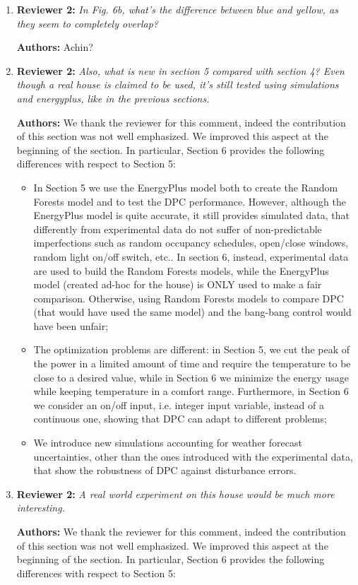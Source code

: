 \documentclass{article}
\begin{document}
\begin{enumerate}
\item \textbf{Reviewer 2:} \textit{In Fig. 6b, what's the difference between blue and yellow, as they seem to completely overlap?}



\textbf{Authors:} Achin?



\item \textbf{Reviewer 2:} \textit{Also, what is new in section 5 compared with section 4? Even though a real house is claimed to be used, it's still tested using simulations and energyplus, like in the previous sections.}


\textbf{Authors:} We thank the reviewer for this comment, indeed the contribution of this section was not well emphasized. We improved this aspect at the beginning of the section. In particular, Section 6 provides the following differences with respect to Section 5:
\begin{itemize}
	\item In Section 5 we use the EnergyPlus model both to create the Random Forests model and to test the DPC performance.
	However, although the EnergyPlus model is quite accurate, it still provides simulated data, that differently from experimental data do not suffer of non-predictable imperfections such as random occupancy schedules, open/close windows, random light on/off switch, etc.. In section 6, instead, experimental data are used to build the Random Forests models, while the EnergyPlus model (created ad-hoc for the house) is ONLY used to make a fair comparison. Otherwise, using Random Forests models to compare DPC (that would have used the same model) and the bang-bang control would have been unfair;
	\item The optimization problems are different: in Section 5, we cut the peak of the power in a limited amount of time and require the temperature to be close to a desired value, while in Section 6 we minimize the energy usage while keeping temperature in a comfort range. Furthermore, in Section 6 we consider an on/off input, i.e. integer input variable, instead of a continuous one, showing that DPC can adapt to different problems;
	\item We introduce new simulations accounting for weather forecast uncertainties, other than the ones introduced with the experimental data, that show the robustness of DPC against disturbance errors.
\end{itemize}

\item \textbf{Reviewer 2:} \textit{A real world experiment on this house would be much more interesting.}

\textbf{Authors:} We thank the reviewer for this comment, indeed the contribution of this section was not well emphasized. We improved this aspect at the beginning of the section. In particular, Section 6 provides the following differences with respect to Section 5:


\end{enumerate}

%



%
\end{document}
